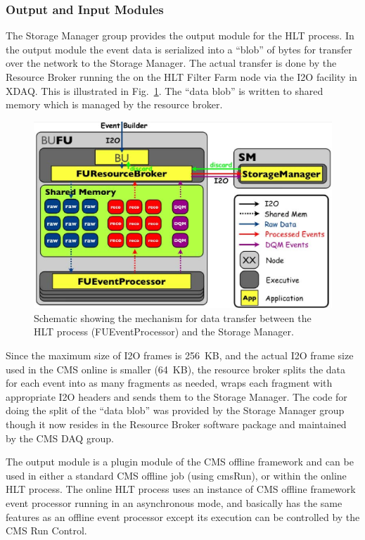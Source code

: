 \subsubsection{Output and Input Modules}

The Storage Manager group provides the output module for the HLT process. In
the output module the event data is serialized into a ``blob'' of bytes for
transfer over the network to the Storage Manager. The actual transfer is
done by the Resource Broker running the on the HLT Filter Farm node via
the I2O facility in XDAQ. This is illustrated in Fig.~\ref{fig:ps_fudesign}.
The ``data blob'' is written to shared memory which is managed by the
resource broker.

\begin{figure}[hbtp]
  \begin{center}
    \includegraphics[width=5.5in]{Software/ps_fudesign.eps}
    \caption{Schematic showing the mechanism for data transfer between the
HLT process (FUEventProcessor) and the Storage Manager.}
    \label{fig:ps_fudesign}
  \end{center}
\end{figure}

Since the maximum size of I2O frames is 256~KB, and the actual I2O frame
size used in the CMS online is smaller (64~KB), the resource broker 
splits the data for each event into as many fragments as needed, wraps each fragment with
appropriate I2O headers and sends them to the Storage Manager. The code for
doing the split of the ``data blob'' was provided by the Storage Manager
group though it now resides in the Resource Broker software package and
maintained by the CMS DAQ group.

The output module is a plugin module of the CMS offline framework and can be
used in either a standard CMS offline job (using cmsRun), or within the online
HLT process. The online HLT process uses an instance of CMS offline framework
event processor running in an asynchronous mode, and basically has the same
features as an offline event processor except its execution can be controlled
by the CMS Run Control.

